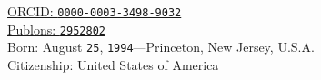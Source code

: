 \documentclass[11pt, letterpaper]{article}
\newcommand*{\img}[1]{%
    \raisebox{-.3\baselineskip}{%
        \texttt{[image: \#1]}%
    }%
}
\begin{document}


\href{https://orcid.org/0000-0003-3498-9032}{\textcolor{orcidlogocol}{\aiOrcid} \hspace{2mm}ORCID: \texttt{0000-0003-3498-9032}}\\
\href{https://publons.com/researcher/2952802}{\aiPublons \hspace{2mm} Publons: \texttt{2952802}}\\[.2cm]
Born:  August \texttt{25}, \texttt{1994}---Princeton, New Jersey, U.S.A.\\
Citizenship:  United States of America
\end{document}
